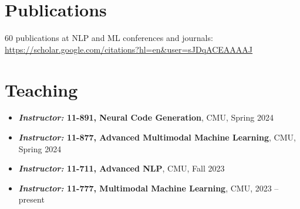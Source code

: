 \section{Publications}
60 publications at NLP and ML conferences and journals: \url{https://scholar.google.com/citations?hl=en&user=sJDqACEAAAAJ}
 \vspace{-0.5em}

\section{Teaching}
\begin{itemize}[leftmargin=-0.4mm,partopsep=0pt,label=]
  \item \textbf{\emph{Instructor:} 11-891, Neural Code Generation}, CMU, Spring 2024
  \item \textbf{\emph{Instructor:} 11-877, Advanced Multimodal Machine Learning}, CMU, Spring 2024
  \item \textbf{\emph{Instructor:} 11-711, Advanced NLP}, CMU, Fall 2023
  \item \textbf{\emph{Instructor:} 11-777, Multimodal Machine Learning}, CMU, 2023 -- present
\end{itemize}
 \vspace{-0.5em}

